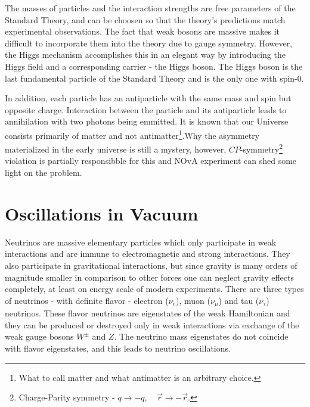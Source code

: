 The masses of particles and the interaction strengths are free parameters of the Standard Theory, and
can be choosen so that the theory's predictions match experimental observations. The fact that weak bosons
are massive makes it difficult to incorporate them into the theory due to gauge symmetry. However, the
Higgs mechanism accomplishes this in an elegant way by introducing the Higgs field and a corresponding
carrier - the Higgs boson. The Higgs boson is the last fundamental particle of the Standard Theory and
is the only one with spin-0.

In addition, each particle has an antiparticle with the same mass and spin but opposite charge. 
Interaction between the particle and its antiparticle leads to annihilation with two photons being emmitted.
It is known that our Universe consists primarily of matter and not antimatter\footnote{What to call 
matter and what antimatter is an arbitrary choice.}.Why the asymmetry materialized in the early universe is
still a mystery, however, $CP$-symmetry\footnote{Charge-Parity symmetry - $q \rightarrow -q, \quad 
\vec{r} \rightarrow -\vec{r}$.} violation is partially responsibble for this and NOvA experiment can 
shed some light on the problem. 


\section{Oscillations in Vacuum}
Neutrinos are massive elementary particles which only participate in weak interactions 
and are immune to electromagnetic and strong interactions. They also participate 
in gravitational interactions, but since gravity is many orders of magnitude smaller 
in comparison to other forces one can neglect gravity effects completely, at least 
on energy scale of modern experiments. There are three types of neutrinos - 
with definite flavor - electron ($\nu_e$), muon ($\nu_\mu$) and tau ($\nu_\tau$) 
neutrinos. These flavor neutrinos are eigenstates of the weak Hamiltonian and they 
can be produced or destroyed only in weak interactions via exchange of the weak 
gauge bosons $W^\pm$ and $Z$. The neutrino mass eigenstates do not coincide with 
flavor eigenstates, and this leads to neutrino oscillations.

